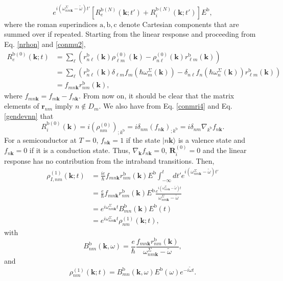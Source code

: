 {\begin{equation}
e^{i(\omega^\Sigma_{nm\mathbf{k}}-\tilde{\omega})t'}
\left[R_e^{\mathrm{b}(N)}(\mathbf{k};t')+R_i^{\mathrm{b}(N)}(\mathbf{k};t')\right]E^{\mathrm{b}}
,
\end{equation}
where the roman superindices
$\mathrm{a},\mathrm{b},\mathrm{c}$ denote Cartesian components that are summed over if repeated.
Starting from the linear response and proceeding from Eq. \eqref{nrhon} and  \eqref{conmu2},
\begin{align}\label{R0e}
R_e^{\mathrm{b}(0)}(\mathbf{k};t)
&=
\sum_{\ell}
\left(
r^{\mathrm{b}}_{n\ell}(\mathbf{k})
\rho^{(0)}_{\ell m}(\mathbf{k})
-
\rho^{(0)}_{n\ell}(\mathbf{k})
r^{\mathrm{b}}_{\ell m}(\mathbf{k})
\right)
\nonumber \\
&=
\sum_{\ell}
\left(
r^{\mathrm{b}}_{n\ell}(\mathbf{k})
\delta_{\ell m}f_m(\hbar\omega^\Sigma_m(\mathbf{k}))
-
\delta_{n\ell}f_n(\hbar\omega^{\Sigma}_{n}(\mathbf{k}))
r^{\mathrm{b}}_{\ell m}(\mathbf{k})
\right)
\nonumber \\
&=
f_{mn\mathbf{k}}
r^{\mathrm{b}}_{nm}(\mathbf{k}),
\end{align}
where $f_{mn\mathbf{k}}=f_{m\mathbf{k}}-f_{n\mathbf{k}}$.
From now on,
it should be clear that the matrix elements of $\mathbf{r}_{nm}$ imply
$n\notin D_m$.
We also have from Eq. \eqref{conmri4} and Eq. \eqref{gendevnn} that
\begin{equation}\label{R0i}
R_i^{\mathrm{b}(0)}(\mathbf{k})
= i(\rho^{(0)}_{nm})_{;k^{\mathrm{b}}}
= i\delta_{nm}(f_{n\mathbf{k}})_{;k^{\mathrm{b}}}
= i\delta_{nm}\nabla_{k^{\mathrm{b}}} f_{n\mathbf{k}}.
\end{equation}
For a semiconductor at $T = 0$, $f_{n\mathbf{k}} = 1$ if the state
$|n\mathbf{k}\rangle$ is a valence state and $f_{n\mathbf{k}} = 0$ if it is a
conduction state. Thus, $\nabla_\mathbf{k} f_{n\mathbf{k}} = 0$,
$\mathbf{R}_i^{(0)} = 0$ and the linear response has no contribution from the
intraband transitions. Then,
\begin{align}\label{rtilde2n}
\rho^{(1)}_{I,nm}(\mathbf{k};t)
&=\frac{ie}{\hbar}
f_{mn\mathbf{k}}
r^{\mathrm{b}}_{nm}(\mathbf{k})E^{\mathrm{b}}
\int_{-\infty}^t dt'
e^{i(\omega^\Sigma_{nm\mathbf{k}}-\tilde{\omega})t'}
\nonumber \\
&=\frac{e}{\hbar}
f_{mn\mathbf{k}}
r^{\mathrm{b}}_{nm}(\mathbf{k})E^{\mathrm{b}}
\frac{e^{i(\omega^\Sigma_{nm\mathbf{k}}-\tilde{\omega})t}}
{\omega^\Sigma_{nm\mathbf{k}}-\tilde{\omega}}
\nonumber \\
&=
e^{i\omega^\Sigma_{nm\mathbf{k}}t}
B^{\mathrm{b}}_{mn}(\mathbf{k})E^{\mathrm{b}}(t)
\nonumber \\
&=
e^{i\omega^\Sigma_{nm\mathbf{k}}t}
\rho^{(1)}_{nm}(\mathbf{k};t)
,
\end{align}
with
\begin{equation}\label{rho1} 
B^{\mathrm{b}}_{nm}(\mathbf{k},\omega)=
\frac{e}{\hbar}
\frac{f_{mn\mathbf{k}}r^{\mathrm{b}}_{nm}(\mathbf{k})}
     {\omega^\Sigma_{nm\mathbf{k}}-\tilde{\omega}},
\end{equation} 
and
\begin{equation}\label{rhonoi1}
\rho^{(1)}_{nm}(\mathbf{k};t)
= B^{\mathrm{b}}_{mn}(\mathbf{k},\omega)E^{\mathrm{b}}(\omega)
  e^{-i\tilde{\omega}t}.
\end{equation}

}
